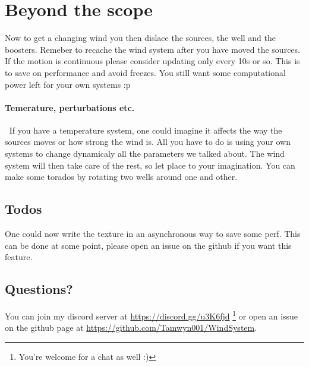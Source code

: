 \documentclass[../main.tex]{subfile}
\begin{document}
\section{Beyond the scope}
    Now to get a changing wind you then dislace the sources, the well and the boosters. Remeber to recache the wind system after you have moved the sources. If the motion is
    continuous please consider updating only every 10s or so. This is to save on performance and avoid freezes. You still want some computational power left 
    for your own systems :p\\

    \paragraph{Temerature, perturbations etc.} $~$ If you have a temperature system, one could imagine it affects the way the sources moves or how strong the wind is. All
    you have to do is using your own systems to change dynamicaly all the parameters we talked about. The wind system will then take care of the rest,
     so let place to your imagination. You can make some torados by rotating two wells around one and other.\\

     \subsection{Todos} 
     One could now write the texture in an asynchronous way to save some perf. This can be done at some point, please open an issue on the github if you want this feature.\\

     \subsection{Questions?}
     You can join my discord server at \url{https://discord.gg/u3K6fjd} \footnote{You're welcome for a chat as well :)} or open an issue on the github page at \url{https://github.com/Tamwyn001/WindSystem}.\\
\end{document}
